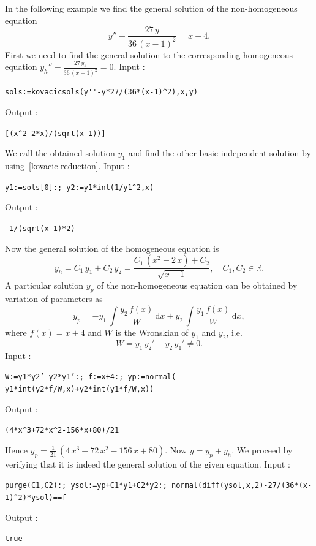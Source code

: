 \documentclass[a4paper,11pt]{book}
\begin{document}
In the following example we find the general solution of the non-homogeneous equation
\[ y''-\frac{27\,y}{36\,(x-1)^2}=x+4. \]
First we need to find the general solution to the corresponding homogeneous equation $y_h''-\frac{27\,y_h}{36\,(x-1)^2}=0$. Input :
\begin{center}
  \tt sols:=kovacicsols(y\verb|''|-y*27/(36*(x-1)\verb|^|2),x,y)
\end{center}
Output :
\begin{center}
  \tt [(x\verb|^|2-2*x)/(sqrt(x-1))]
\end{center}
We call the obtained solution $y_1$ and find the other basic independent solution by using~\eqref{kovacic-reduction}. Input :
\begin{center}
  \tt y1:=sols[0]:; y2:=y1*int(1/y1\verb|^|2,x)
\end{center}
Output :
\begin{center}
  \tt -1/(sqrt(x-1)*2)
\end{center}
Now the general solution of the homogeneous equation is
\[ y_h=C_1\,y_1+C_2\,y_2=\frac{C_1\,(x^2-2\,x)+C_2}{\sqrt{x-1}},\quad C_1,C_2\in\mathbb{R}. \]
A particular solution $y_p$ of the non-homogeneous equation can be obtained by variation of parameters as
\[ y_p=-y_1\,\int\frac{y_2\,f(x)}{W}\,\mathrm{d}x+y_2\,\int\frac{y_1\,f(x)}{W}\,\mathrm{d}x, \]
where $f(x)=x+4$ and $W$ is the Wronskian of $y_1$ and $y_2$, i.e.~\[W=y_1\,y_2'-y_2\,y_1'\neq 0.\] Input :
\begin{center}
  \tt W:=y1*y2'-y2*y1':; f:=x+4:; yp:=normal(-y1*int(y2*f/W,x)+y2*int(y1*f/W,x))
\end{center}
Output :
\begin{center}
  \tt (4*x\verb|^|3+72*x\verb|^|2-156*x+80)/21
\end{center}
Hence $y_p=\frac{1}{21}\,(4\,x^3+72\,x^2-156\,x+80)$. Now $y=y_p+y_h$. We proceed by verifying that it is indeed the general solution of the given equation. Input :
\begin{center}
  \tt purge(C1,C2):; ysol:=yp+C1*y1+C2*y2:; normal(diff(ysol,x,2)-27/(36*(x-1)\verb|^|2)*ysol)==f
\end{center}
Output :
\begin{center}
  \tt true
\end{center}
\end{document}
